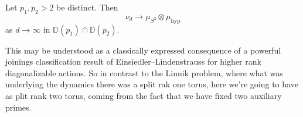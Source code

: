 \documentclass[reqno]{amsart} 
\begin{document}
\begin{theorem}
  Let $p_1, p_2 > 2$ be distinct.  Then
  \begin{equation*}
    \nu_d \rightarrow \mu_{S^2 } \otimes \mu_{\mathrm{hyp}}
  \end{equation*}
  as $d \rightarrow \infty $ in $\mathbb{D} (p_1 ) \cap \mathbb{D} (p_2 )$.
\end{theorem}
This may be understood as a classically expressed consequence of a powerful joinings classification result of Einsiedler--Lindenstrauss for higher rank diagonalizable actions.  So in contrast to the Linnik problem, where what was underlying the dynamics there was a split rak one torus, here we're going to have as plit rank two torus, coming from the fact that we have fixed two auxiliary primes.
\end{document}
